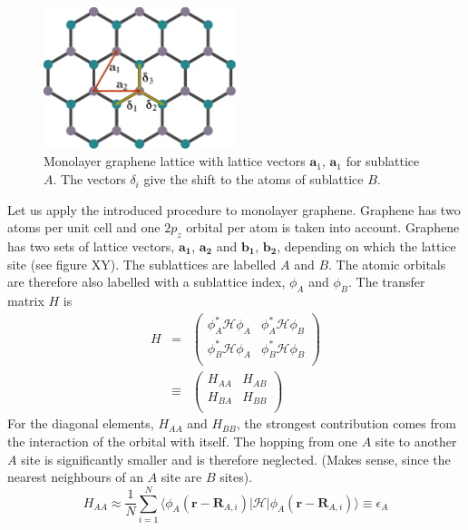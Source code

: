 \begin{figure}
\centering
\includegraphics[width=0.5\textwidth]{figure/numericalframework/graphene_lattice_single_layer_csch}
\caption{Monolayer graphene lattice with lattice vectors $\mathbf{a}_1$, $\mathbf{a}_1$ for sublattice $A$. The vectors $\delta_i$ give the shift to the atoms of sublattice $B$. }
\end{figure}
Let us apply the introduced procedure to monolayer graphene. Graphene has two atoms per unit cell and  one $2p_z$ orbital per atom is taken into account. Graphene has two sets of lattice vectors, $\mathbf{a_1}$, $\mathbf{a_2}$ and $\mathbf{b_1}$, $\mathbf{b_2}$, depending on which the lattice site (see figure XY). The sublattices are labelled $A$ and $B$. The atomic orbitals are therefore also labelled with a sublattice index, $\phi_A$ and $\phi_B$. The transfer matrix $H$ is
\begin{eqnarray}
H &=& \begin{pmatrix}
\phi_A^* \mathcal{H} \phi_A & \phi_A^* \mathcal{H} \phi_B \\
\phi_B^* \mathcal{H} \phi_A & \phi_B^* \mathcal{H} \phi_B\\
\end{pmatrix} \\
&\equiv& \begin{pmatrix}
H_{A A} & H_{A B} \\
H_{B A} & H_{B B}\\
\end{pmatrix}
\end{eqnarray}
For the diagonal elements, $H_{A A}$ and $H_{B B}$, the strongest contribution comes from the interaction of the orbital with itself. The hopping from one $A$ site to another $A$ site is significantly smaller and is therefore neglected. (Makes sense, since the nearest neighbours of an $A$ site are $B$ sites).
\begin{equation}
H_{A A} \approx \frac{1}{N} \sum_{i=1}^N \langle \phi_A ( \mathbf{r} - \mathbf{R}_{A, i} ) | \mathcal{H} |  \phi_A ( \mathbf{r} - \mathbf{R}_{A, i} ) \rangle \equiv \epsilon_A
\end{equation}
